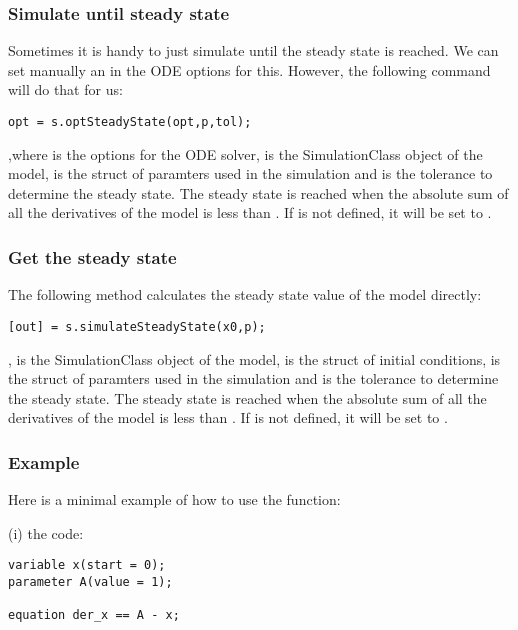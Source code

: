 \documentclass[11pt]{article}
\begin{document}
\subsubsection{Simulate until steady state}

Sometimes it is handy to just simulate until the steady state is reached. We can set manually an  in the ODE options for this. However, the following command will do that for us:

\begin{lstlisting}
opt = s.optSteadyState(opt,p,tol);
\end{lstlisting}

,where  is the options for the ODE solver,  is the SimulationClass object of the model,  is the struct of paramters used in the simulation and  is the tolerance to determine the steady state. The steady state is reached when the absolute sum of all the derivatives of the model is less than . If  is not defined, it will be set to .

\subsubsection{Get the steady state}

The following method calculates the steady state value of the model directly:

\begin{lstlisting}
[out] = s.simulateSteadyState(x0,p);
\end{lstlisting}

,  is the SimulationClass object of the model,  is the struct of initial conditions,  is the struct of paramters used in the simulation and  is the tolerance to determine the steady state. The steady state is reached when the absolute sum of all the derivatives of the model is less than . If  is not defined, it will be set to .

\subsubsection{Example}

Here is a minimal example of how to use the  function:

(i) the  code:

\begin{lstlisting}
variable x(start = 0); 
parameter A(value = 1);

equation der_x == A - x;
\end{lstlisting}
\end{document}
